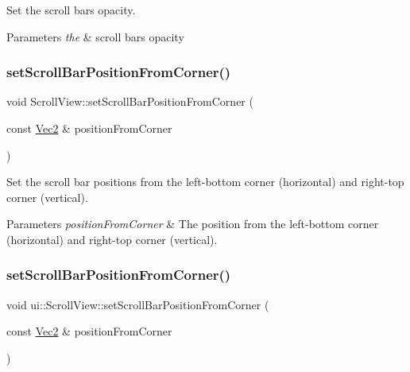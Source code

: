 Set the scroll bar\textquotesingle{}s opacity. 


\begin{DoxyParams}{Parameters}
{\em the} & scroll bar\textquotesingle{}s opacity \\
\hline
\end{DoxyParams}
\mbox{\label{classui_1_1ScrollView_a73cc3e15cbfbe923f63ead0db6f71de0}} 
\subsubsection{\texorpdfstring{set\+Scroll\+Bar\+Position\+From\+Corner()}{setScrollBarPositionFromCorner()}\hspace{0.1cm}{\footnotesize\ttfamily [1/2]}}
{\footnotesize\ttfamily void Scroll\+View\+::set\+Scroll\+Bar\+Position\+From\+Corner (\begin{DoxyParamCaption}\item[{const \hyperlink{classVec2}{Vec2} \&}]{position\+From\+Corner }\end{DoxyParamCaption})}



Set the scroll bar positions from the left-\/bottom corner (horizontal) and right-\/top corner (vertical). 


\begin{DoxyParams}{Parameters}
{\em position\+From\+Corner} & The position from the left-\/bottom corner (horizontal) and right-\/top corner (vertical). \\
\hline
\end{DoxyParams}
\mbox{\label{classui_1_1ScrollView_a3f67e139a785ef521789f9e768f500d7}} 
\subsubsection{\texorpdfstring{set\+Scroll\+Bar\+Position\+From\+Corner()}{setScrollBarPositionFromCorner()}\hspace{0.1cm}{\footnotesize\ttfamily [2/2]}}
{\footnotesize\ttfamily void ui\+::\+Scroll\+View\+::set\+Scroll\+Bar\+Position\+From\+Corner (\begin{DoxyParamCaption}\item[{const \hyperlink{classVec2}{Vec2} \&}]{position\+From\+Corner }\end{DoxyParamCaption})}



